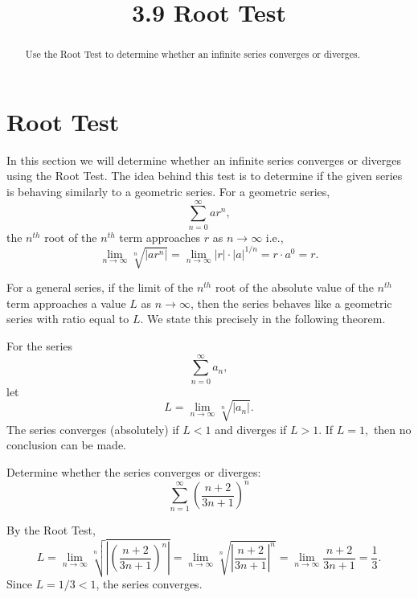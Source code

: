 \documentclass{ximera}
\title{3.9 Root Test}
\begin{document}
\begin{abstract}
Use the Root Test to determine whether an infinite series converges or diverges.
\end{abstract}

\maketitle

\section{Root Test}

In this section we will determine whether an infinite series converges or diverges using the Root Test. 
The idea behind this test is to determine if the given series is behaving similarly to a geometric series.
For a geometric series, 
\[
\sum_{n=0}^\infty ar^n,
\]
the $n^{th}$ root of the $n^{th}$ term approaches $r$ as $n \to \infty$ i.e., 
\[
\lim_{n \to \infty} \sqrt[n]{\left|ar^n\right|} = \lim_{n \to \infty} \left|r\right| \cdot \left|a\right|^{1/n} = r\cdot a^0 = r.
\]



For a general series, if the limit of the $n^{th}$ root of the absolute value of the $n^{th}$ term
approaches a value $L$ as $n \to \infty$, then the series behaves like a geometric series with ratio equal to $L$.
We state this precisely in the following theorem.

\begin{theorem}
For the series
\[
\sum_{n=0}^\infty a_n,
\]
let
\[
L = \lim_{n \to \infty} \sqrt[n]{\left|{a_n}\right|}.
\]
The series converges (absolutely) if $L < 1$ and diverges if $L>1$. 
If $L = 1,$ then no conclusion can be made.

\end{theorem}






\begin{example}[example 1]
Determine whether the series converges or diverges:
\[
\sum_{n=1}^\infty \left(\frac{n+ 2}{3n+1}\right)^n
\]


By the Root Test,
\[
L =  \lim_{n \to \infty} \sqrt[n]{\left|\left(\frac{n+ 2}{3n+1}\right)^n\right|}=  \lim_{n \to \infty} \sqrt[n]{\left|\frac{n+ 2}{3n+1}\right|^n} = \lim_{n \to \infty} \frac{n+ 2}{3n+1} = \frac13.
\]
Since $L = 1/3 < 1$, the series converges.

\end{example}





\begin{center}
\begin{foldable}
\end{foldable}
\end{center}
\end{document}
